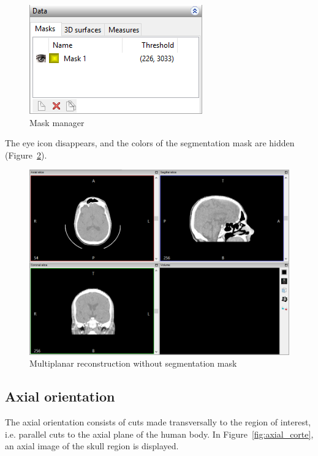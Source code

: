 \begin{figure}[!htb]
\centering
\includegraphics[scale=0.8]{../user_guide_figures/invesalius_screen/data_mask_en.png}
\caption{Mask manager}
\label{fig:ger_masc}
\end{figure}

The eye icon disappears, and the colors of the segmentation mask are hidden (Figure~\ref{fig:mpr_sem_mask}).

\begin{figure}[!htb]
\centering
\includegraphics[scale=0.30]{../user_guide_figures/invesalius_screen/multiplanar_window_en.png}
\caption{Multiplanar reconstruction without segmentation mask}
\label{fig:mpr_sem_mask}
\end{figure}

\subsection{Axial orientation}

The axial orientation consists of cuts made transversally to the region of interest, i.e. parallel cuts to the axial plane of the human body.
In Figure~\ref{fig:axial_corte}, an axial image of the skull region is displayed.

